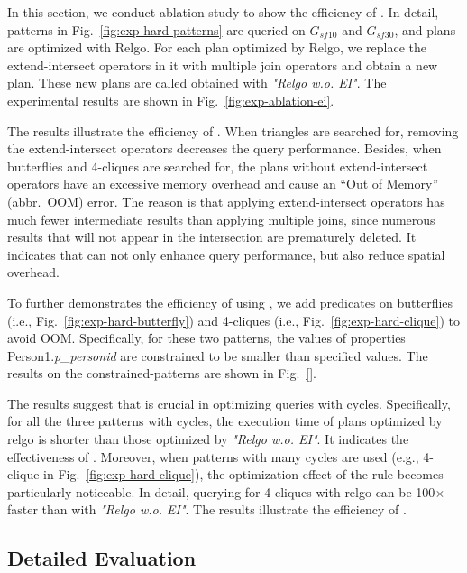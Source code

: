 In this section, we conduct ablation study to show the efficiency of \expandintersectrule.
In detail, patterns in Fig.~\ref{fig:exp-hard-patterns} are queried on $G_{sf10}$ and $G_{sf30}$, and plans are optimized with Relgo.
For each plan optimized by Relgo, we replace the extend-intersect operators in it with multiple join operators and obtain a new plan.
These new plans are called obtained with \textit{"Relgo w.o. EI"}.
The experimental results are shown in Fig.~\ref{fig:exp-ablation-ei}.

The results illustrate the efficiency of \expandintersectrule.
When triangles are searched for, removing the extend-intersect operators decreases the query performance.
Besides, when butterflies and 4-cliques are searched for, the plans without extend-intersect operators have an excessive memory overhead and cause an ``Out of Memory'' (abbr.~OOM) error.
The reason is that applying extend-intersect operators has much fewer intermediate results than applying multiple joins, since numerous results that will not appear in the intersection are prematurely deleted.
It indicates that \expandintersectrule can not only enhance query performance, but also reduce spatial overhead.

To further demonstrates the efficiency of using \expandintersectrule, we add predicates on butterflies (i.e., Fig.~\ref{fig:exp-hard-butterfly}) and 4-cliques (i.e., Fig.~\ref{fig:exp-hard-clique}) to avoid OOM.
Specifically, for these two patterns, the values of properties Person1.\textit{p\_personid} are constrained to be smaller than specified values.
The results on the constrained-patterns are shown in Fig.~\ref{}.


The results suggest that \expandintersectrule is crucial in optimizing queries with cycles.
Specifically, for all the three patterns with cycles, the execution time of plans optimized by relgo is shorter than those optimized by \textit{"Relgo w.o. EI"}.
It indicates the effectiveness of \expandintersectrule.
Moreover, when patterns with many cycles are used (e.g., 4-clique in Fig.~\ref{fig:exp-hard-clique}), the optimization effect of the rule becomes particularly noticeable.
In detail, querying for 4-cliques with relgo can be 100$\times$ faster than with \textit{"Relgo w.o. EI"}.
The results illustrate the efficiency of \expandintersectrule.


\subsection{Detailed Evaluation}
\label{sec:experiment-detail}

